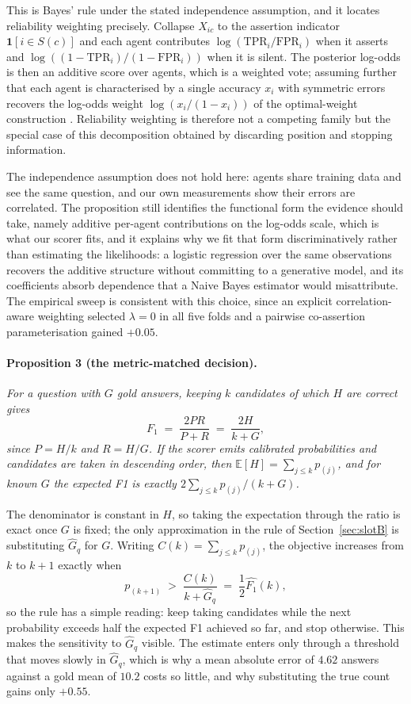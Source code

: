 \documentclass{article}
\begin{document}
This is Bayes' rule under the stated independence assumption, and it locates reliability weighting precisely. Collapse $X_{ic}$ to the assertion indicator $\mathbf{1}[i \in S(c)]$ and each agent contributes $\log(\mathrm{TPR}_i / \mathrm{FPR}_i)$ when it asserts and $\log((1-\mathrm{TPR}_i)/(1-\mathrm{FPR}_i))$ when it is silent. The posterior log-odds is then an additive score over agents, which is a weighted vote; assuming further that each agent is characterised by a single accuracy $x_i$ with symmetric errors recovers the log-odds weight $\log(x_i / (1 - x_i))$ of the optimal-weight construction \cite{ai2025majority}. Reliability weighting is therefore not a competing family but the special case of this decomposition obtained by discarding position and stopping information.

The independence assumption does not hold here: agents share training data and see the same question, and our own measurements show their errors are correlated. The proposition still identifies the functional form the evidence should take, namely additive per-agent contributions on the log-odds scale, which is what our scorer fits, and it explains why we fit that form discriminatively rather than estimating the likelihoods: a logistic regression over the same observations recovers the additive structure without committing to a generative model, and its coefficients absorb dependence that a Naive Bayes estimator would misattribute. The empirical sweep is consistent with this choice, since an explicit correlation-aware weighting selected $\lambda = 0$ in all five folds and a pairwise co-assertion parameterisation gained $+0.05$.

\paragraph{Proposition 3 (the metric-matched decision).}
\emph{For a question with $G$ gold answers, keeping $k$ candidates of which $H$ are correct gives}
\[
  F_1 \;=\; \frac{2PR}{P+R} \;=\; \frac{2H}{k+G},
\]
\emph{since $P = H/k$ and $R = H/G$. If the scorer emits calibrated probabilities and candidates are taken in descending order, then $\mathbb{E}[H] = \sum_{j \leq k} p_{(j)}$, and for known $G$ the expected F1 is exactly $2\sum_{j\leq k} p_{(j)} / (k+G)$.}

The denominator is constant in $H$, so taking the expectation through the ratio is exact once $G$ is fixed; the only approximation in the rule of Section~\ref{sec:slotB} is substituting $\hat{G}_q$ for $G$. Writing $C(k) = \sum_{j \leq k} p_{(j)}$, the objective increases from $k$ to $k+1$ exactly when
\[
  p_{(k+1)} \;>\; \frac{C(k)}{k + \hat{G}_q} \;=\; \frac{1}{2}\widehat{F_1}(k),
\]
so the rule has a simple reading: keep taking candidates while the next probability exceeds half the expected F1 achieved so far, and stop otherwise. This makes the sensitivity to $\hat{G}_q$ visible. The estimate enters only through a threshold that moves slowly in $\hat{G}_q$, which is why a mean absolute error of $4.62$ answers against a gold mean of $10.2$ costs so little, and why substituting the true count gains only $+0.55$.
\end{document}
